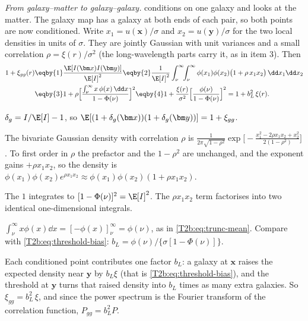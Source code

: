 \emph{From galaxy--matter to galaxy--galaxy.}  conditions on one galaxy and looks at the matter. The galaxy map has a galaxy at both ends of each pair, so both points are now conditioned. Write $x_1=u(\bm x)/\sigma$ and $x_2=u(\bm y)/\sigma$ for the two local densities in units of $\sigma$. They are jointly Gaussian with unit variances and a small correlation $\rho=\xi(r)/\sigma^2$ (the long-wavelength parts carry it, as in item 3). Then
\begin{align}
  1+\xi_{gg}(r)
  &\eqby{1}\frac{\E[I(\bm x)I(\bm y)]}{\E[I]^2}
  \eqby{2}\frac{1}{\E[I]^2}\int_\nu^\infty\!\!\int_\nu^\infty\phi(x_1)\phi(x_2)\big(1+\rho\,x_1x_2\big)\,\dd x_1\dd x_2\nonumber\\
  &\eqby{3}1+\rho\Big[\frac{\int_\nu^\infty x\,\phi(x)\,\dd x}{1-\Phi(\nu)}\Big]^2
  \eqby{4}1+\frac{\xi(r)}{\sigma^2}\Big[\frac{\phi(\nu)}{1-\Phi(\nu)}\Big]^2
  =1+b_L^2\,\xi(r) .
  \label{T2b:eq:threshold-auto}
\end{align}
\begin{explain}
  \item $\delta_g=I/\E[I]-1$, so $\E[(1+\delta_g(\bm x))(1+\delta_g(\bm y))]=1+\xi_{gg}$.
  \item The bivariate Gaussian density with correlation $\rho$ is $\frac{1}{2\pi\sqrt{1-\rho^2}}\exp\big[-\frac{x_1^2-2\rho x_1x_2+x_2^2}{2(1-\rho^2)}\big]$. To first order in $\rho$ the prefactor and the $1-\rho^2$ are unchanged, and the exponent gains $+\rho x_1x_2$, so the density is $\phi(x_1)\phi(x_2)e^{\rho x_1x_2}\approx\phi(x_1)\phi(x_2)(1+\rho x_1x_2)$.
  \item The $1$ integrates to $[1-\Phi(\nu)]^2=\E[I]^2$. The $\rho x_1x_2$ term factorises into two identical one-dimensional integrals.
  \item $\int_\nu^\infty x\phi(x)\dd x=[-\phi(x)]_\nu^\infty=\phi(\nu)$, as in \eqref{T2b:eq:trunc-mean}. Compare with \eqref{T2b:eq:threshold-bias}: $b_L=\phi(\nu)/\{\sigma[1-\Phi(\nu)]\}$.
\end{explain}
Each conditioned point contributes one factor $b_L$: a galaxy at $\bm x$ raises the expected density near $\bm y$ by $b_L\xi$ (that is \eqref{T2b:eq:threshold-bias}), and the threshold at $\bm y$ turns that raised density into $b_L$ times as many extra galaxies. So $\xi_{gg}=b_L^2\,\xi$, and since the power spectrum is the Fourier transform of the correlation function, $P_{gg}=b_L^2P$.

